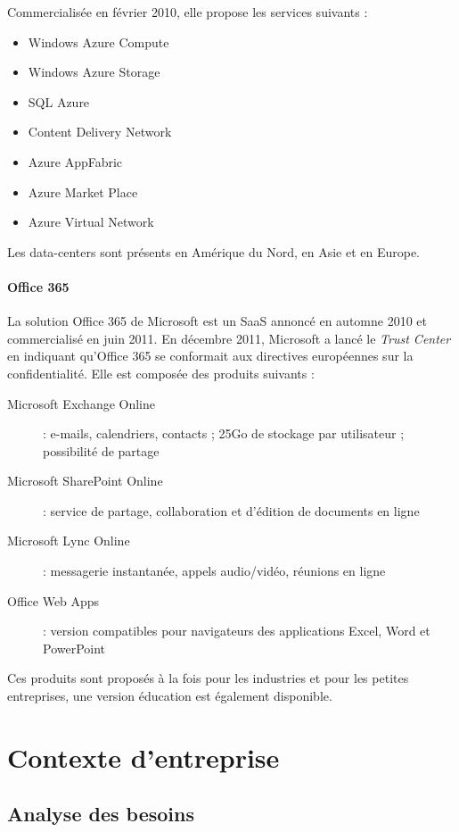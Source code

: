 \documentclass[a4paper,12pt]{report}
\begin{document}
\begin{onehalfspace}
Commercialisée en février 2010, elle propose les services suivants :
\begin{itemize}
\item Windows Azure Compute
\item Windows Azure Storage
\item SQL Azure
\item Content Delivery Network
\item Azure AppFabric
\item Azure Market Place
\item Azure Virtual Network
\end{itemize}

Les data-centers sont présents en Amérique du Nord, en Asie et en Europe.

\subsubsection{Office 365}
La solution Office 365 de Microsoft est un SaaS annoncé en automne 2010 et commercialisé en juin 2011. En décembre 2011, Microsoft a lancé le \textit{Trust Center} en indiquant qu'Office 365 se conformait aux directives européennes sur la confidentialité\cite{source:netzwelt}.
Elle est composée des produits suivants :
\begin{description}
\item[Microsoft Exchange Online] : e-mails, calendriers, contacts ; 25Go de stockage par utilisateur ; possibilité de partage
\item[Microsoft SharePoint Online] : service de partage, collaboration et d'édition de documents en ligne
\item[Microsoft Lync Online] : messagerie instantanée, appels audio/vidéo, réunions en ligne
\item[Office Web Apps] : version compatibles pour navigateurs des applications Excel, Word et PowerPoint
\end{description}

Ces produits sont proposés à la fois pour les industries et pour les petites entreprises, une version éducation est également disponible.

	\chapter{Contexte d’entreprise}
	
	\section{Analyse des besoins}


\end{onehalfspace}
\end{document}
